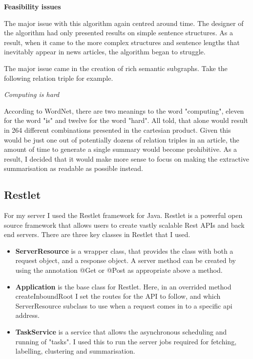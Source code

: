 \documentclass[12pt]{article}
\begin{document}
\textbf{Feasibility issues}

The major issue with this algorithm again centred around time. The designer of the algorithm had only presented results on simple sentence structures. As a result, when it came to the more complex structures and sentence lengths that inevitably appear in news articles, the algorithm began to struggle.

The major issue came in the creation of rich semantic subgraphs. Take the following relation triple for example.\\

\begin{displayquote}\emph{
Computing is hard\\}
\end{displayquote}

According to WordNet, there are two meanings to the word "computing", eleven for the word "is" and twelve for the word "hard". All told, that alone would result in 264 different combinations presented in the cartesian product. Given this would be just one out of potentially dozens of relation triples in an article, the amount of time to generate a single summary would become prohibitive. As a result, I decided that it would make more sense to focus on making the extractive summarisation as readable as possible instead. 

\subsection{Restlet}

\label{Restlet}

For my server I used the Restlet framework for Java. Restlet is a powerful open source framework that allows users to create vastly scalable Rest APIs and back end servers. There are three key classes in Restlet that I used.\\

\begin{itemize}
	\item \textbf{ServerResource} is a wrapper class, that provides the class with both a request object, and a response object. A server method can be created by using the annotation @Get or @Post as appropriate above a method. 
	\item \textbf{Application} is the base class for Restlet. Here, in an overrided method createInboundRoot I set the routes for the API to follow, and which ServerResource subclass to use when a request comes in to a specific api address. 
	\item \textbf{TaskService} is a service that allows the asynchronous scheduling and running of "tasks". I used this to run the server jobs required for fetching, labelling, clustering and summarisation. 
\end{itemize}
\end{document}
